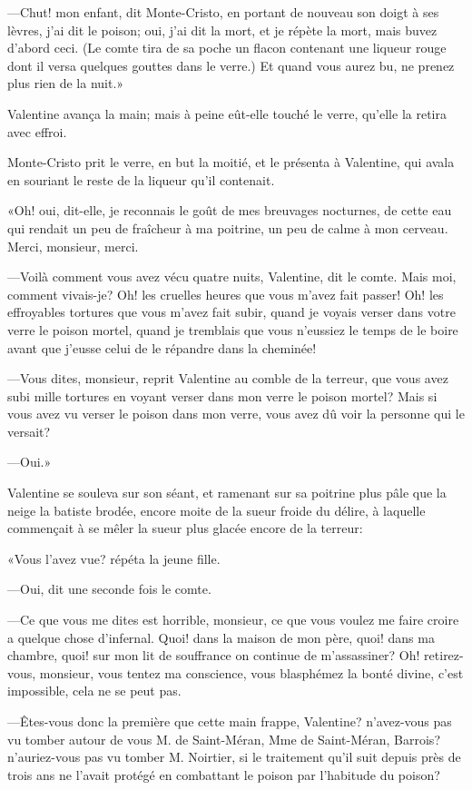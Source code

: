 —Chut! mon enfant, dit Monte-Cristo, en portant de nouveau son doigt à ses lèvres, j'ai dit le poison; oui, j'ai dit la mort, et je répète la mort, mais buvez d'abord ceci. (Le comte tira de sa poche un flacon contenant une liqueur rouge dont il versa quelques gouttes dans le verre.) Et quand vous aurez bu, ne prenez plus rien de la nuit.» 

Valentine avança la main; mais à peine eût-elle touché le verre, qu'elle la retira avec effroi. 

Monte-Cristo prit le verre, en but la moitié, et le présenta à Valentine, qui avala en souriant le reste de la liqueur qu'il contenait. 

«Oh! oui, dit-elle, je reconnais le goût de mes breuvages nocturnes, de cette eau qui rendait un peu de fraîcheur à ma poitrine, un peu de calme à mon cerveau. Merci, monsieur, merci. 

—Voilà comment vous avez vécu quatre nuits, Valentine, dit le comte. Mais moi, comment vivais-je? Oh! les cruelles heures que vous m'avez fait passer! Oh! les effroyables tortures que vous m'avez fait subir, quand je voyais verser dans votre verre le poison mortel, quand je tremblais que vous n'eussiez le temps de le boire avant que j'eusse celui de le répandre dans la cheminée! 

—Vous dites, monsieur, reprit Valentine au comble de la terreur, que vous avez subi mille tortures en voyant verser dans mon verre le poison mortel? Mais si vous avez vu verser le poison dans mon verre, vous avez dû voir la personne qui le versait? 

—Oui.» 

Valentine se souleva sur son séant, et ramenant sur sa poitrine plus pâle que la neige la batiste brodée, encore moite de la sueur froide du délire, à laquelle commençait à se mêler la sueur plus glacée encore de la terreur: 

«Vous l'avez vue? répéta la jeune fille. 

—Oui, dit une seconde fois le comte. 

—Ce que vous me dites est horrible, monsieur, ce que vous voulez me faire croire a quelque chose d'infernal. Quoi! dans la maison de mon père, quoi! dans ma chambre, quoi! sur mon lit de souffrance on continue de m'assassiner? Oh! retirez-vous, monsieur, vous tentez ma conscience, vous blasphémez la bonté divine, c'est impossible, cela ne se peut pas. 

—Êtes-vous donc la première que cette main frappe, Valentine? n'avez-vous pas vu tomber autour de vous M. de Saint-Méran, Mme de Saint-Méran, Barrois? n'auriez-vous pas vu tomber M. Noirtier, si le traitement qu'il suit depuis près de trois ans ne l'avait protégé en combattant le poison par l'habitude du poison? 

